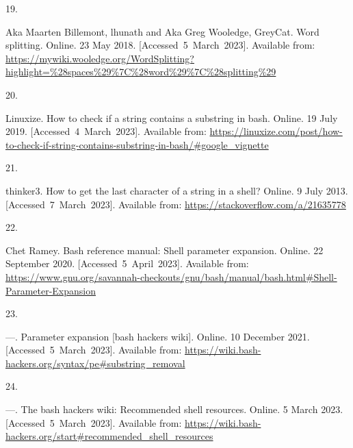\documentclass[
  a4paper,
]{article}
\newlength{\cslhangindent}
\newlength{\csllabelwidth}
\newlength{\cslentryspacingunit} %
\newenvironment{CSLReferences}[2] %
 {%
  \setlength{\parindent}{0pt}
  \ifodd #1
  \let\oldpar\par
  \def\par{\hangindent=\cslhangindent\oldpar}
  \fi
  \setlength{\parskip}{#2\cslentryspacingunit}
 }%
 {}
\newcommand{\CSLLeftMargin}[1]{\parbox[t]{\csllabelwidth}{#1}}
\newcommand{\CSLRightInline}[1]{\parbox[t]{\linewidth - \csllabelwidth}{#1}\break}
\begin{document}
\begin{CSLReferences}{0}{0}
\leavevmode{}%
\CSLLeftMargin{19. }%
\CSLRightInline{Aka Maarten Billemont, lhunath and Aka Greg Wooledge,
GreyCat. Word splitting. Online. 23 May 2018.
{[}Accessed~5~March~2023{]}. Available from:
\url{https://mywiki.wooledge.org/WordSplitting?highlight=\%28spaces\%29\%7C\%28word\%29\%7C\%28splitting\%29}}

\leavevmode{}%
\CSLLeftMargin{20. }%
\CSLRightInline{Linuxize. How to check if a string contains a substring
in bash. Online. 19 July 2019. {[}Accessed~4~March~2023{]}. Available
from:
\url{https://linuxize.com/post/how-to-check-if-string-contains-substring-in-bash/\#google_vignette}}

\leavevmode{}%
\CSLLeftMargin{21. }%
\CSLRightInline{thinker3. How to get the last character of a string in a
shell? Online. 9 July 2013. {[}Accessed~7~March~2023{]}. Available from:
\url{https://stackoverflow.com/a/21635778}}

\leavevmode{}%
\CSLLeftMargin{22. }%
\CSLRightInline{Chet Ramey. Bash reference manual: Shell parameter
expansion. Online. 22 September 2020. {[}Accessed~5~April~2023{]}.
Available from:
\url{https://www.gnu.org/savannah-checkouts/gnu/bash/manual/bash.html\#Shell-Parameter-Expansion}}

\leavevmode{}%
\CSLLeftMargin{23. }%
\CSLRightInline{---. Parameter expansion {[}bash hackers wiki{]}.
Online. 10 December 2021. {[}Accessed~5~March~2023{]}. Available from:
\url{https://wiki.bash-hackers.org/syntax/pe\#substring_removal}}

\leavevmode{}%
\CSLLeftMargin{24. }%
\CSLRightInline{---. The bash hackers wiki: Recommended shell resources.
Online. 5 March 2023. {[}Accessed~5~March~2023{]}. Available from:
\url{https://wiki.bash-hackers.org/start\#recommended_shell_resources}}

\end{CSLReferences}
\end{document}
